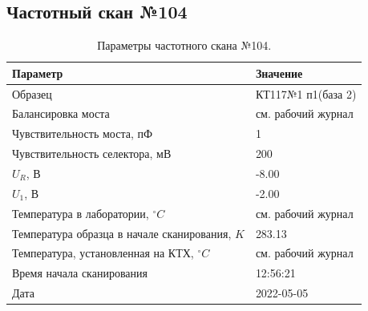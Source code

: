 \subsection{Частотный скан №104}
\begin{table}[!ht]
    \centering
    \caption{Параметры частотного скана №104.}
    \begin{tabular}{|l|l|}
        \hline
        Параметр                                       & Значение                  \\ \hline
        Образец                                        & КТ117№1 п1(база 2)        \\ \hline
        Балансировка моста                             & см. рабочий журнал        \\ \hline
        Чувствительность моста, пФ                     & 1                         \\ \hline
        Чувствительность селектора, мВ                 & 200                       \\ \hline
        $U_R$, В                                       & -8.00                     \\ \hline
        $U_1$, В                                       & -2.00                     \\ \hline
        Температура в лаборатории, $^\circ C$          & см. рабочий журнал        \\ \hline
        Температура образца в начале сканирования, $K$ & 283.13                    \\ \hline
        Температура, установленная на КТХ, $^\circ C$  & см. рабочий журнал        \\ \hline
        Время начала сканирования                      & 12:56:21                  \\ \hline
        Дата                                           & 2022-05-05                \\ \hline
    \end{tabular}
    \label{table:frequency_scan_104}
\end{table}

